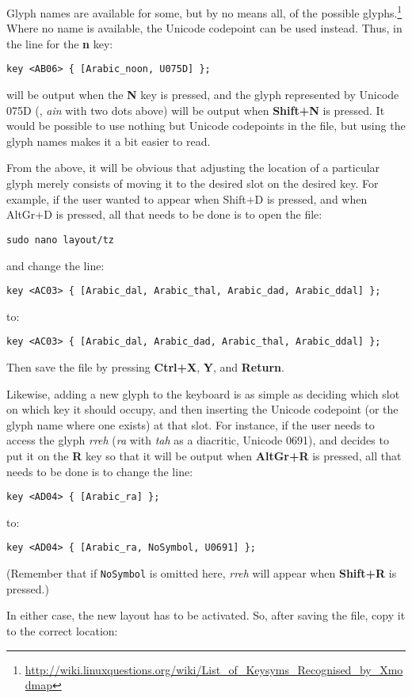 Glyph names are available for some, but by no means all, of the possible glyphs.\footnote{\url{http://wiki.linuxquestions.org/wiki/List_of_Keysyms_Recognised_by_Xmodmap}}  Where no name is available, the Unicode codepoint can be used instead.  Thus, in the line for the \textbf{n} key:

\verb|key <AB06> { [Arabic_noon, U075D] };|

 will be output when the \textbf{N} key is pressed, and the glyph represented by Unicode 075D (, \textit{ain} with two dots above) will be output when \textbf{Shift+N} is pressed.  It would be possible to use nothing but Unicode codepoints in the file, but using the glyph names makes it a bit easier to read.

From the above, it will be obvious that adjusting the location of a particular glyph merely consists of moving it to the desired slot on the desired key.  For example, if the user wanted  to appear when Shift+D is pressed, and  when AltGr+D is pressed, all that needs to be done is to open the file:

\verb|sudo nano layout/tz|

and change the line:

\verb|key <AC03> { [Arabic_dal, Arabic_thal, Arabic_dad, Arabic_ddal] };|

to:

\verb|key <AC03> { [Arabic_dal, Arabic_dad, Arabic_thal, Arabic_ddal] };|

Then save the file by pressing \textbf{Ctrl+X}, \textbf{Y}, and \textbf{Return}.

Likewise, adding a new glyph to the keyboard is as simple as deciding which slot on which key it should occupy, and then inserting the Unicode codepoint (or the glyph name where one exists) at that slot.  For instance, if the user needs to access the glyph \textit{rreh} (\textit{ra} with \textit{tah} as a diacritic, Unicode 0691), and decides to put it on the \textbf{R} key so that it will be output when \textbf{AltGr+R} is pressed, all that needs to be done is to change the line:

\verb|key <AD04> { [Arabic_ra] };|

to:

\verb|key <AD04> { [Arabic_ra, NoSymbol, U0691] };|

(Remember that if \verb|NoSymbol| is omitted here, \textit{rreh} will appear when \textbf{Shift+R} is pressed.)

In either case, the new layout has to be activated.  So, after saving the file, copy it to the correct location:

